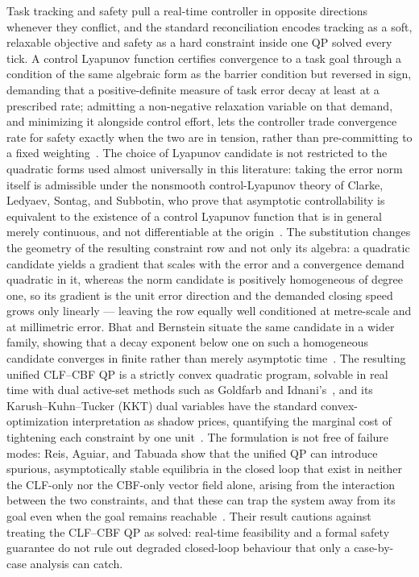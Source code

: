 Task tracking and safety pull a real-time controller in opposite directions whenever they conflict, and the standard reconciliation encodes tracking as a soft, relaxable objective and safety as a hard constraint inside one QP solved every tick. A control Lyapunov function certifies convergence to a task goal through a condition of the same algebraic form as the barrier condition but reversed in sign, demanding that a positive-definite measure of task error decay at least at a prescribed rate; admitting a non-negative relaxation variable on that demand, and minimizing it alongside control effort, lets the controller trade convergence rate for safety exactly when the two are in tension, rather than pre-committing to a fixed weighting~\cite{ames2017cbf}. The choice of Lyapunov candidate is not restricted to the quadratic forms used almost universally in this literature: taking the error norm itself is admissible under the nonsmooth control-Lyapunov theory of Clarke, Ledyaev, Sontag, and Subbotin, who prove that asymptotic controllability is equivalent to the existence of a control Lyapunov function that is in general merely continuous, and not differentiable at the origin~\cite{clarke1997asymptotic}. The substitution changes the geometry of the resulting constraint row and not only its algebra: a quadratic candidate yields a gradient that scales with the error and a convergence demand quadratic in it, whereas the norm candidate is positively homogeneous of degree one, so its gradient is the unit error direction and the demanded closing speed grows only linearly --- leaving the row equally well conditioned at metre-scale and at millimetric error. Bhat and Bernstein situate the same candidate in a wider family, showing that a decay exponent below one on such a homogeneous candidate converges in finite rather than merely asymptotic time~\cite{bhat2000finitetime}. The resulting unified CLF--CBF QP is a strictly convex quadratic program, solvable in real time with dual active-set methods such as Goldfarb and Idnani's~\cite{goldfarb1983}, and its Karush--Kuhn--Tucker (KKT) dual variables have the standard convex-optimization interpretation as shadow prices, quantifying the marginal cost of tightening each constraint by one unit~\cite{boyd2004}. The formulation is not free of failure modes: Reis, Aguiar, and Tabuada show that the unified QP can introduce spurious, asymptotically stable equilibria in the closed loop that exist in neither the CLF-only nor the CBF-only vector field alone, arising from the interaction between the two constraints, and that these can trap the system away from its goal even when the goal remains reachable~\cite{reis2021undesirable}. Their result cautions against treating the CLF--CBF QP as solved: real-time feasibility and a formal safety guarantee do not rule out degraded closed-loop behaviour that only a case-by-case analysis can catch.

